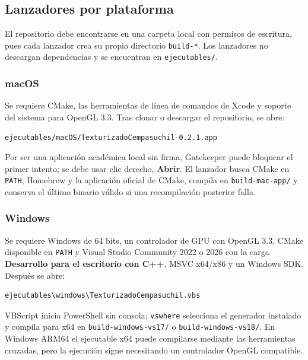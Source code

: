 \documentclass[letter,11pt]{article}
\begin{document}
	\subsection{Lanzadores por plataforma}
	El repositorio debe encontrarse en una carpeta local con permisos de escritura, pues cada lanzador crea su propio directorio \texttt{build-*}. Los lanzadores no descargan dependencias y se encuentran en \texttt{ejecutables/}.
	
	\subsubsection{macOS}
	Se requiere CMake, las herramientas de línea de comandos de Xcode y soporte del sistema para OpenGL 3.3. Tras clonar o descargar el repositorio, se abre:
	\begin{lstlisting}[style=terminal]
ejecutables/macOS/TexturizadoCempasuchil-0.2.1.app
	\end{lstlisting}
	Por ser una aplicación académica local sin firma, Gatekeeper puede bloquear el primer intento; se debe usar clic derecho, \textbf{Abrir}. El lanzador busca CMake en \texttt{PATH}, Homebrew y la aplicación oficial de CMake, compila en \texttt{build-mac-app/} y conserva el último binario válido si una recompilación posterior falla.

	\subsubsection{Windows}
	Se requiere Windows de 64 bits, un controlador de GPU con OpenGL 3.3, CMake disponible en \texttt{PATH} y Visual Studio Community 2022 o 2026 con la carga \textbf{Desarrollo para el escritorio con C++}, MSVC x64/x86 y un Windows SDK. Después se abre:
	\begin{lstlisting}[style=terminal]
ejecutables\windows\TexturizadoCempasuchil.vbs
	\end{lstlisting}
	VBScript inicia PowerShell sin consola; \texttt{vswhere} selecciona el generador instalado y compila para x64 en \texttt{build-windows-vs17/} o \texttt{build-windows-vs18/}. En Windows ARM64 el ejecutable x64 puede compilarse mediante las herramientas cruzadas, pero la ejecución sigue necesitando un controlador OpenGL compatible.
\end{document}

